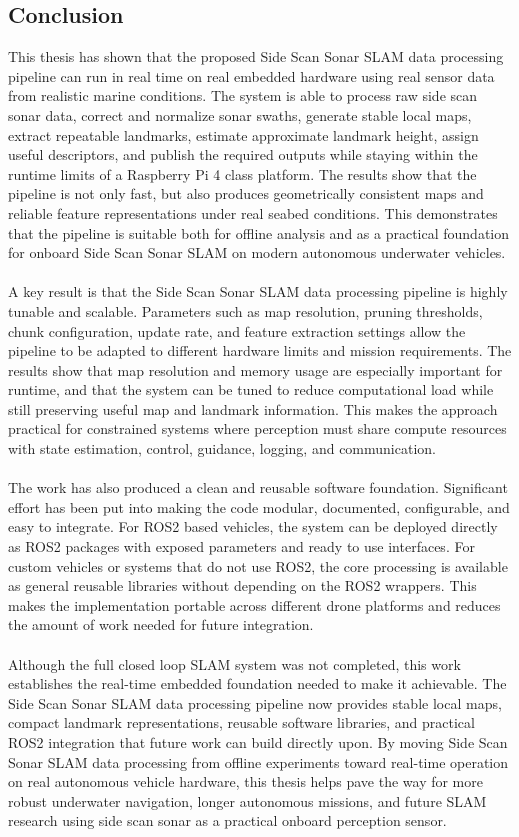 \subsection{Conclusion}
This thesis has shown that the proposed Side Scan Sonar SLAM data processing pipeline can run in real time on real embedded hardware using real sensor data from realistic marine conditions. The system is able to process raw side scan sonar data, correct and normalize sonar swaths, generate stable local maps, extract repeatable landmarks, estimate approximate landmark height, assign useful descriptors, and publish the required outputs while staying within the runtime limits of a Raspberry Pi 4 class platform. The results show that the pipeline is not only fast, but also produces geometrically consistent maps and reliable feature representations under real seabed conditions. This demonstrates that the pipeline is suitable both for offline analysis and as a practical foundation for onboard Side Scan Sonar SLAM on modern autonomous underwater vehicles.
\\ \\
A key result is that the Side Scan Sonar SLAM data processing pipeline is highly tunable and scalable. Parameters such as map resolution, pruning thresholds, chunk configuration, update rate, and feature extraction settings allow the pipeline to be adapted to different hardware limits and mission requirements. The results show that map resolution and memory usage are especially important for runtime, and that the system can be tuned to reduce computational load while still preserving useful map and landmark information. This makes the approach practical for constrained systems where perception must share compute resources with state estimation, control, guidance, logging, and communication.
\\ \\
The work has also produced a clean and reusable software foundation. Significant effort has been put into making the code modular, documented, configurable, and easy to integrate. For ROS2 based vehicles, the system can be deployed directly as ROS2 packages with exposed parameters and ready to use interfaces. For custom vehicles or systems that do not use ROS2, the core processing is available as general reusable libraries without depending on the ROS2 wrappers. This makes the implementation portable across different drone platforms and reduces the amount of work needed for future integration.
\\ \\
Although the full closed loop SLAM system was not completed, this work establishes the real-time embedded foundation needed to make it achievable. The Side Scan Sonar SLAM data processing pipeline now provides stable local maps, compact landmark representations, reusable software libraries, and practical ROS2 integration that future work can build directly upon. By moving Side Scan Sonar SLAM data processing from offline experiments toward real-time operation on real autonomous vehicle hardware, this thesis helps pave the way for more robust underwater navigation, longer autonomous missions, and future SLAM research using side scan sonar as a practical onboard perception sensor.
